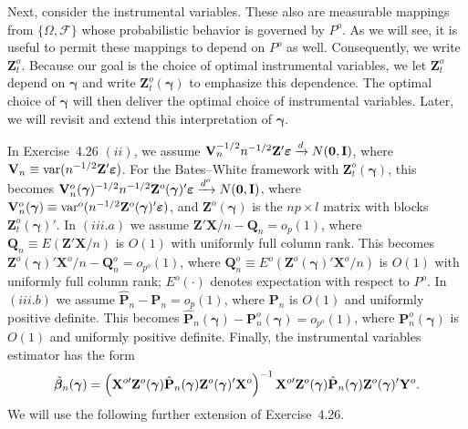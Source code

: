 Next, consider the instrumental variables. These also are measurable
mappings from $\{\Omega, \mathcal{F}\}$ whose probabilistic behavior is governed by $P^o$. As
we will see, it is useful to permit these mappings to depend on $P^o$ as well.
Consequently, we write $\mathbf{Z}_t^o$. Because our goal is the choice of optimal instrumental variables, we let $\mathbf{Z}_t^o$ depend on $\boldsymbol{\gamma}$ and write $\mathbf{Z}_t^o(\boldsymbol{\gamma})$ to emphasize this
dependence. The optimal choice of $\boldsymbol{\gamma}$ will then deliver the optimal choice of
instrumental variables. Later, we will revisit and extend this interpretation
of $\boldsymbol{\gamma}$.

In Exercise~4.26 $(ii)$, we assume $\mathbf{V}_n^{-1/2}n^{-1/2}\mathbf{Z}'\boldsymbol{\varepsilon} \xrightarrow{d} N(\mathbf{0}, \mathbf{I})$, where
$\mathbf{V}_n \equiv \mathrm{var}(n^{-1/2}\mathbf{Z}'\boldsymbol{\varepsilon})$. For the Bates--White framework with $\mathbf{Z}_t^o(\boldsymbol{\gamma})$, this
becomes $\mathbf{V}_n^o(\boldsymbol{\gamma})^{-1/2}n^{-1/2}\mathbf{Z}^o(\boldsymbol{\gamma})'\boldsymbol{\varepsilon} \xrightarrow{d^o} N(\mathbf{0}, \mathbf{I})$, where $\mathbf{V}_n^o(\boldsymbol{\gamma}) \equiv \mathrm{var}^o(n^{-1/2}
\mathbf{Z}^o(\boldsymbol{\gamma})'\boldsymbol{\varepsilon})$, and $\mathbf{Z}^o(\boldsymbol{\gamma})$ is the $np \times l$ matrix with blocks $\mathbf{Z}_t^o(\boldsymbol{\gamma})'$. In $(iii.a)$ we
assume $\mathbf{Z}'\mathbf{X}/n - \mathbf{Q}_n = o_p(1)$, where $\mathbf{Q}_n \equiv E(\mathbf{Z}'\mathbf{X}/n)$ is $O(1)$ with uniformly full column rank. This becomes $\mathbf{Z}^o(\boldsymbol{\gamma})'\mathbf{X}^o/n - \mathbf{Q}_n^o = o_{p^o}(1)$, where
$\mathbf{Q}_n^o \equiv E^o(\mathbf{Z}^o(\boldsymbol{\gamma})'\mathbf{X}^o/n)$ is $O(1)$ with uniformly full column rank; $E^o(\cdot)$ denotes expectation with respect to $P^o$. In $(iii.b)$ we assume $\hat{\mathbf{P}}_n - \mathbf{P}_n = o_p(1)$, where $\mathbf{P}_n$ is $O(1)$ and uniformly positive definite. This becomes
$\hat{\mathbf{P}}_n(\boldsymbol{\gamma}) - \mathbf{P}_n^o(\boldsymbol{\gamma}) = o_{p^o}(1)$, where $\mathbf{P}_n^o(\boldsymbol{\gamma})$ is $O(1)$ and uniformly positive definite. Finally, the instrumental variables estimator has the form
\[
\tilde{\boldsymbol{\beta}}_n(\boldsymbol{\gamma}) = \left(\mathbf{X}^{o\prime}\mathbf{Z}^o(\boldsymbol{\gamma})\hat{\mathbf{P}}_n(\boldsymbol{\gamma})\mathbf{Z}^o(\boldsymbol{\gamma})'\mathbf{X}^o\right)^{-1}\mathbf{X}^{o\prime}\mathbf{Z}^o(\boldsymbol{\gamma})\hat{\mathbf{P}}_n(\boldsymbol{\gamma})\mathbf{Z}^o(\boldsymbol{\gamma})'\mathbf{Y}^o.
\]
We will use the following further extension of Exercise~4.26.

